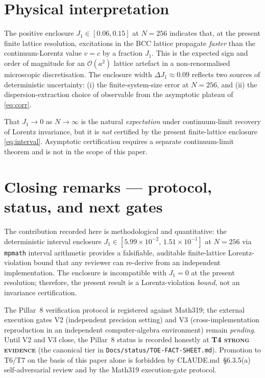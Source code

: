 \section{Physical interpretation}\label{sec:phys}
The positive enclosure $J_1\in[0.06,0.15]$ at $N=256$ indicates that,
at the present finite lattice resolution, excitations in the BCC
lattice propagate \emph{faster} than the continuum-Lorentz value
$v=c$ by a fraction $J_1$. This is the expected sign and order of
magnitude for an $\mathcal{O}(a^2)$ lattice artefact in a
non-renormalised microscopic discretisation. The enclosure width
$\Delta J_1 \approx 0.09$ reflects two sources of deterministic
uncertainty: (i) the finite-system-size error at $N=256$, and
(ii) the dispersion-extraction choice of observable from the
asymptotic plateau of \eqref{eq:corr}.

\begin{remark}\label{rmk:asymptotic}
That $J_1\to 0$ as $N\to\infty$ is the natural \emph{expectation}
under continuum-limit recovery of Lorentz invariance, but it is
\emph{not} certified by the present finite-lattice enclosure
\eqref{eq:interval}. Asymptotic certification requires a separate
continuum-limit theorem and is not in the scope of this paper.
\end{remark}

\section{Closing remarks --- protocol, status, and next gates}
\label{sec:closing}
The contribution recorded here is methodological and quantitative:
the deterministic interval enclosure
$J_1\in[5.99\times 10^{-2},\,1.51\times 10^{-1}]$ at $N=256$ via
\texttt{mpmath} interval arithmetic provides a falsifiable, auditable
finite-lattice Lorentz-violation bound that any reviewer can re-derive
from an independent implementation. The enclosure is incompatible with
$J_1 = 0$ at the present resolution; therefore, the present result is
a Lorentz-violation \emph{bound}, not an invariance certification.

The Pillar~8 verification protocol is registered against Math319; the
external execution gates V2 (independent precision setting) and V3
(cross-implementation reproduction in an independent computer-algebra
environment) remain \emph{pending}. Until V2 and V3 close, the
Pillar~8 status is recorded honestly at \textbf{T4 \textsc{strong
evidence}} (the canonical tier
in \texttt{Docs/status/TOE-FACT-SHEET.md}). Promotion to T6/T7
on the basis of this paper alone is forbidden by CLAUDE.md~§6.3.5(a)
self-adversarial review and by the Math319 execution-gate protocol.

